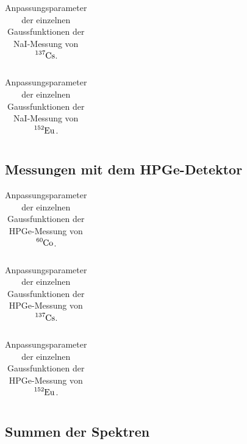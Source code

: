 \begin{table}[H]
    \centering
    \begin{tabular}{|c|c|c|c|c|} \hline
    
    \end{tabular}
    \caption{Anpassungsparameter der einzelnen Gaussfunktionen der NaI-Messung von $\ce{^137Cs}$.}
    \label{tab:nai_cs_peaks}
\end{table}

\begin{table}[H]
    \centering
    \begin{tabular}{|c|c|c|c|c|} \hline
    
    \end{tabular}
    \caption{Anpassungsparameter der einzelnen Gaussfunktionen der NaI-Messung von $\ce{^152Eu}$.}
    \label{tab:nai_eu_peaks}
\end{table}

\subsection{Messungen mit dem HPGe-Detektor}

\begin{table}[H]
    \centering
    \begin{tabular}{|c|c|c|c|c|} \hline
    
    \end{tabular}
    \caption{Anpassungsparameter der einzelnen Gaussfunktionen der HPGe-Messung von $\ce{^60Co}$.}
    \label{tab:ge_co_peaks}
\end{table}

\begin{table}[H]
    \centering
    \begin{tabular}{|c|c|c|c|c|} \hline
    
    \end{tabular}
    \caption{Anpassungsparameter der einzelnen Gaussfunktionen der HPGe-Messung von $\ce{^137Cs}$.}
    \label{tab:ge_cs_peaks}
\end{table}

\begin{table}[H]
    \centering
    \begin{tabular}{|c|c|c|c|c|} \hline
    
    \end{tabular}
    \caption{Anpassungsparameter der einzelnen Gaussfunktionen der HPGe-Messung von $\ce{^152Eu}$.}
    \label{tab:ge_eu_peaks}
\end{table}


\subsection{Summen der Spektren}

